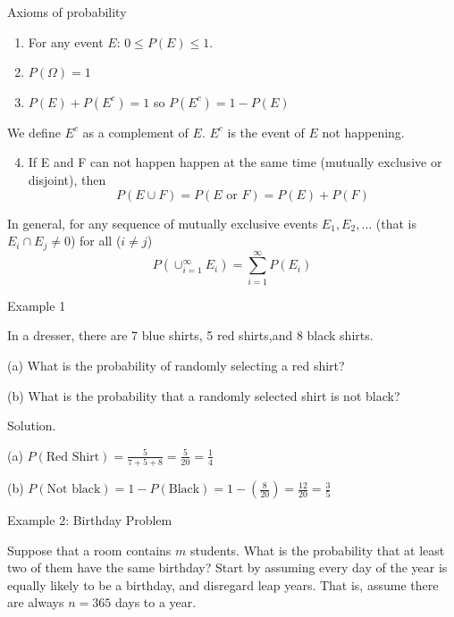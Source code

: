 \documentclass[
  ignorenonframetext,
]{beamer}
\providecommand{\tightlist}{%
  \setlength{\itemsep}{0pt}\setlength{\parskip}{0pt}}
\begin{document}
\begin{frame}{Axioms of probability}
\protect\hypertarget{axioms-of-probability}{}
\begin{enumerate}
\item
  For any event \(E\): \(0\leq P(E) \leq 1.\)
\item
  \(P(\Omega)=1\)
\item
  \(P(E)+P(E^{c})=1\) so \(P(E^c)=1-P(E)\)
\end{enumerate}

We define \(E^{c}\) as a complement of \(E\). \(E^{c}\) is the event of
\(E\) not happening.

\begin{enumerate}
\setcounter{enumi}{3}
\tightlist
\item
  If E and F can not happen happen at the same time (mutually exclusive
  or disjoint), then \[P(E \cup F)=P(E \text{ or } F)=P(E) + P(F)\]
\end{enumerate}

In general, for any sequence of mutually exclusive events
\(E_1, E_2, \ldots\) (that is \(E_i \cap E_j \neq 0\)) for all
(\(i\neq j\))
\[P\left(\cup_{i=1}^{\infty} E_i\right)=\sum_{i=1}^{\infty} P(E_i)\]
\end{frame}

\begin{frame}{Example 1}
\protect\hypertarget{example-1}{}
\begin{tcolorbox}

In a dresser, there are 7 blue shirts, 5 red shirts,and 8 black shirts.

(a) What is the probability of randomly selecting a red shirt?

(b) What is the probability that a randomly selected shirt is not black?

\end{tcolorbox}

\pause

\begin{tcolorbox}
Solution.

(a) $P(\text{Red Shirt})=\frac{5}{7+5+8}=\frac{5}{20}=\frac{1}{4}$

(b) $P( \text{Not black})=1 - P(\text{Black})=1 - \left(\frac{8}{20}\right)=\frac{12}{20}=\frac{3}{5}$

\end{tcolorbox}
\end{frame}

\begin{frame}{Example 2: Birthday Problem}
\protect\hypertarget{example-2-birthday-problem}{}
\begin{tcolorbox}

Suppose that a room contains $m$ students. What is the probability that at least two of them have the same birthday? Start by assuming every day of the year is equally likely to be a birthday, and disregard leap years. That is, assume there are always $n=365$ days to a year.

\end{tcolorbox}
\end{frame}
\end{document}
